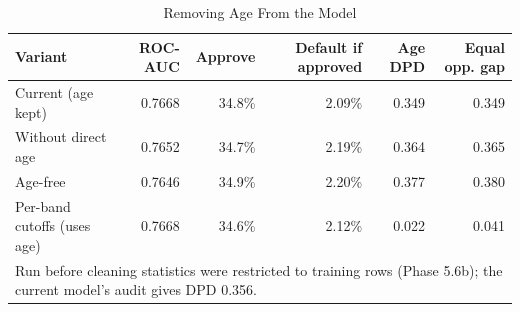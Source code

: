 \begin{table}[t]
\caption{Removing Age From the Model}
\label{tab:age_experiment}
\centering
\setlength{\tabcolsep}{4pt}
\begin{tabular}{lrrrrr}
\hline
\textbf{Variant} & \textbf{ROC-AUC} & \textbf{Approve} & \textbf{Default if approved} & \textbf{Age DPD} & \textbf{Equal opp. gap} \\
\hline
Current (age kept) & 0.7668 & 34.8\% & 2.09\% & 0.349 & 0.349 \\
Without direct age & 0.7652 & 34.7\% & 2.19\% & 0.364 & 0.365 \\
Age-free & 0.7646 & 34.9\% & 2.20\% & 0.377 & 0.380 \\
Per-band cutoffs (uses age) & 0.7668 & 34.6\% & 2.12\% & 0.022 & 0.041 \\
\hline
\multicolumn{6}{p{0.95\linewidth}}{\footnotesize Run before cleaning statistics were restricted to training rows (Phase 5.6b); the current model's audit gives DPD 0.356.} \\
\end{tabular}
\end{table}
